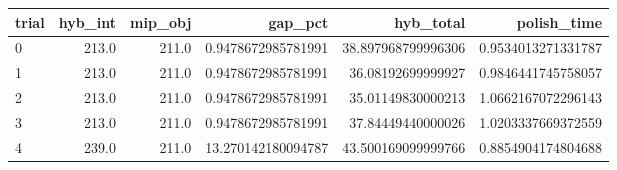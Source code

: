 \begin{tabular}{lrrrrr}
\hline
trial & hyb_int & mip_obj & gap_pct & hyb_total & polish_time \\ \hline
0 & 213.0 & 211.0 & 0.9478672985781991 & 38.897968799996306 & 0.9534013271331787 \\
1 & 213.0 & 211.0 & 0.9478672985781991 & 36.08192699999927 & 0.9846441745758057 \\
2 & 213.0 & 211.0 & 0.9478672985781991 & 35.01149830000213 & 1.0662167072296143 \\
3 & 213.0 & 211.0 & 0.9478672985781991 & 37.84449440000026 & 1.0203337669372559 \\
4 & 239.0 & 211.0 & 13.270142180094787 & 43.500169099999766 & 0.8854904174804688 \\
\hline
\end{tabular}
